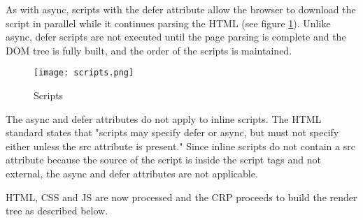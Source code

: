 


As with async, scripts with the defer attribute allow the browser to download the script in parallel while it continues parsing the HTML (see figure \ref{figure:script_loading}).
Unlike async, defer scripts are not executed until the page parsing is complete and the DOM tree is fully built, and the order of the scripts is maintained. %


\begin{figure}[h!]
\begin{center}
\texttt{[image: scripts.png]}
\caption{Scripts}
\label{figure:script_loading}
\end{center}
\end{figure}


The async and defer attributes do not apply to inline scripts.
The HTML standard states that "scripts may specify defer or async, but must not specify either unless the src attribute is present." %
Since inline scripts do not contain a src attribute because the source of the script is inside the script tags and not external, the async and defer attributes are not applicable.






HTML, CSS and JS are now processed and the CRP proceeds to build the render tree as described below.



